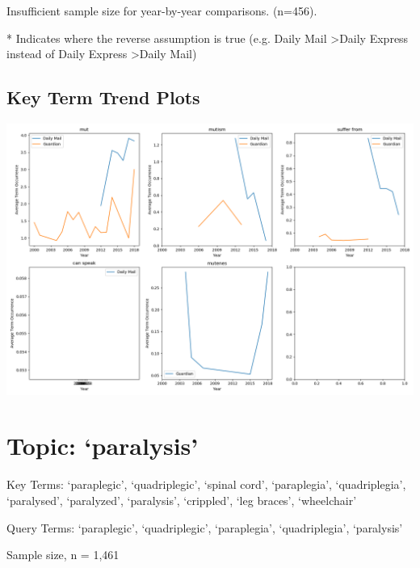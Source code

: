 \documentclass{report}
\begin{document}
\noindent Insufficient sample size for year-by-year comparisons. (n=456).

\noindent ** Indicates where the reverse assumption is true (e.g. Daily Mail \textgreater\space Daily Express instead of Daily Express \textgreater\space Daily Mail)

\subsection{Key Term Trend Plots}
\includegraphics[width=\textwidth]{raw/mute-terms.png}

\newpage
\section{Topic: `paralysis'}
Key Terms: `paraplegic', `quadriplegic', `spinal cord', `paraplegia', `quadriplegia', `paralysed', `paralyzed', `paralysis', `crippled', `leg braces', `wheelchair'

\noindent Query Terms: `paraplegic', `quadriplegic', `paraplegia', `quadriplegia', `paralysis'

\noindent Sample size, n = 1,461
\end{document}
